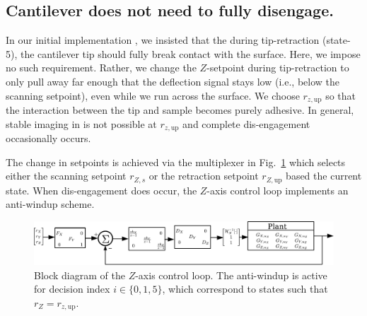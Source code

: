 \documentclass[twocolumn,oneside]{IEEEtran/IEEEtran}
\newcommand{\rzup}{\ensuremath{r_{z,\textrm{up}}}\xspace}
\begin{document}
\subsection{Cantilever does not need to fully disengage.}
In our initial implementation \cite{braker_hardware_2018}, we insisted that the during tip-retraction
(state-5), the cantilever tip should fully break contact with the surface. Here,
we impose no such requirement. Rather, we change the $Z$-setpoint during
tip-retraction to only pull away far enough that the deflection signal stays low
(i.e., below the scanning setpoint), even while we run across the surface.
We choose \rzup so that the interaction between the tip and sample becomes purely adhesive.
In general, stable imaging in is not possible at \rzup and complete dis-engagement occasionally occurs.


The change in setpoints is achieved via the multiplexer in Fig.~\ref{fig:afm_bd_dinv}
which selects either the scanning setpoint $r_{Z,s}$ or the retraction setpoint
$r_{Z,\textrm{up}}$ based the current state.
When dis-engagement does occur, the $Z$-axis control loop implements an anti-windup scheme.


\begin{figure}[ht!]
  \centering
  \includegraphics[width=1\textwidth]{figures/AFM_loop_xyz.pdf}
  \caption{Block diagram of the $Z$-axis control loop. The anti-windup is active
    for decision index $i\in\{0,1,5\}$, which correspond to states such that
    $r_Z=\rzup$.}
  \label{fig:afm_bd_dinv}
\end{figure}
\end{document}
